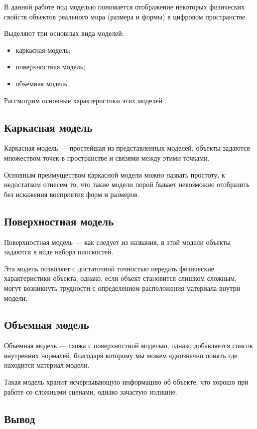 В данной работе под моделью понимается отображение некоторых физических свойств объектов реального мира (размера и формы) в цифровом пространстве.

Выделяют три основных вида моделей:
\begin{itemize}
	\item каркасная модель;
	\item поверхностная модель;
	\item объемная модель.
\end{itemize}

Рассмотрим основные характеристики этих моделей \cite{model}.

\subsection{Каркасная модель}

Каркасная модель --- простейшая из представленных моделей, объекты
задаются множеством точек в пространстве и связями между этими точками.

Основным преимуществом каркасной модели можно назвать простоту, к недостатком отнесем то, что такие модели порой бывает невозможно отобразить без искажения восприятия форм и размеров.

\subsection{Поверхностная модель}

Поверхностная модель \cite{surface} --- как следует из названия, в этой модели объекты задаются в виде набора плоскостей. 

Эта модель позволяет с достаточной точностью передать физические характеристики объекта, однако, если объект становится слишком сложным, могут возникнуть трудности с определением расположения материала внутри модели.

\subsection{Объемная модель}

Объемная модель --- схожа с поверхностной моделью, однако добавляется список внутренних нормалей, благодаря которому мы можем однозначно понять где находится материал модели.

Такая модель хранит исчерпывающую информацию об объекте, что хорошо при работе со сложными сценами, однако зачастую излишне.

\subsection*{Вывод}

